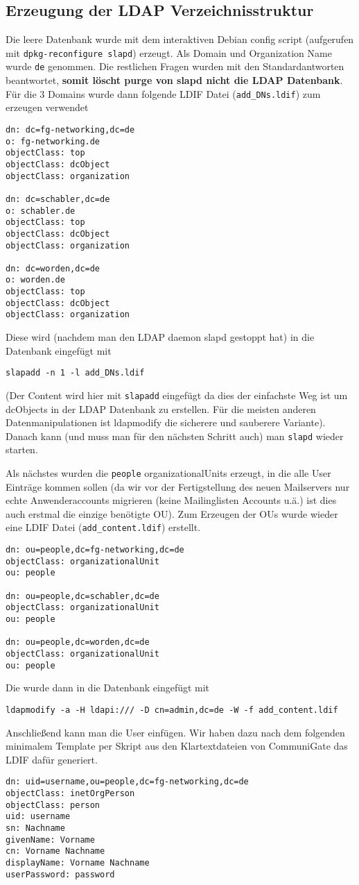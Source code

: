 \documentclass[11pt,a4paper,titlepage=firstiscover]{scrartcl} %
\begin{document}
\subsection{Erzeugung der LDAP Verzeichnisstruktur}
Die leere Datenbank wurde mit dem interaktiven Debian config script (aufgerufen mit \texttt{dpkg-reconfigure slapd}) erzeugt. Als Domain und Organization Name wurde \texttt{de} genommen. Die restlichen Fragen wurden mit den Standardantworten beantwortet, \textbf{somit löscht purge von slapd nicht die LDAP Datenbank}. Für die 3 Domains wurde dann folgende LDIF Datei (\texttt{add\_DNs.ldif}) zum erzeugen verwendet
\begin{lstlisting}
dn: dc=fg-networking,dc=de
o: fg-networking.de
objectClass: top
objectClass: dcObject
objectClass: organization

dn: dc=schabler,dc=de
o: schabler.de
objectClass: top
objectClass: dcObject
objectClass: organization

dn: dc=worden,dc=de
o: worden.de
objectClass: top
objectClass: dcObject
objectClass: organization

\end{lstlisting}
Diese wird (nachdem man den LDAP daemon slapd gestoppt hat) in die Datenbank eingefügt mit
\begin{lstlisting}
slapadd -n 1 -l add_DNs.ldif
\end{lstlisting}
(Der Content wird hier mit \texttt{slapadd} eingefügt da dies der einfachste Weg ist um dcObjects in der LDAP Datenbank zu erstellen. Für die meisten anderen Datenmanipulationen ist ldapmodify die sicherere und sauberere Variante). Danach kann (und muss man für den nächsten Schritt auch) man \texttt{slapd} wieder starten.

Als nächstes wurden die \texttt{people} organizationalUnits erzeugt, in die alle User Einträge kommen sollen (da wir vor der Fertigstellung des neuen Mailservers nur echte Anwenderaccounts migrieren (keine Mailinglisten Accounts u.ä.) ist dies auch erstmal die einzige benötigte OU). Zum Erzeugen der OUs wurde wieder eine LDIF Datei (\texttt{add\_content.ldif}) erstellt.
\begin{lstlisting}
dn: ou=people,dc=fg-networking,dc=de
objectClass: organizationalUnit
ou: people

dn: ou=people,dc=schabler,dc=de
objectClass: organizationalUnit
ou: people

dn: ou=people,dc=worden,dc=de
objectClass: organizationalUnit
ou: people
\end{lstlisting}
Die wurde dann in die Datenbank eingefügt mit
\begin{lstlisting}
ldapmodify -a -H ldapi:/// -D cn=admin,dc=de -W -f add_content.ldif
\end{lstlisting}
Anschließend kann man die User einfügen. Wir haben dazu nach dem folgenden minimalem Template per Skript aus den Klartextdateien von CommuniGate das LDIF dafür generiert.
\begin{lstlisting}
dn: uid=username,ou=people,dc=fg-networking,dc=de
objectClass: inetOrgPerson
objectClass: person
uid: username
sn: Nachname
givenName: Vorname
cn: Vorname Nachname
displayName: Vorname Nachname
userPassword: password
\end{lstlisting}
\end{document}
